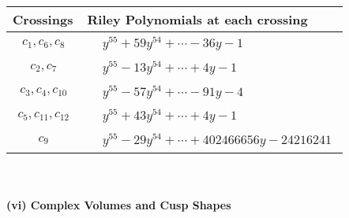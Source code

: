 \documentclass[1p]{elsarticle_modified}
\theoremstyle{definition}
\begin{document}
\begin{tabular}{m{50pt}|m{274pt}}
Crossings & \hspace{64pt}Riley Polynomials at each crossing \\
\hline $$\begin{aligned}c_{1},c_{6},c_{8}\end{aligned}$$&$\begin{aligned}
&y^{55}+59 y^{54}+\cdots-36 y-1
\end{aligned}$\\
\hline $$\begin{aligned}c_{2},c_{7}\end{aligned}$$&$\begin{aligned}
&y^{55}-13 y^{54}+\cdots+4 y-1
\end{aligned}$\\
\hline $$\begin{aligned}c_{3},c_{4},c_{10}\end{aligned}$$&$\begin{aligned}
&y^{55}-57 y^{54}+\cdots-91 y-4
\end{aligned}$\\
\hline $$\begin{aligned}c_{5},c_{11},c_{12}\end{aligned}$$&$\begin{aligned}
&y^{55}+43 y^{54}+\cdots+4 y-1
\end{aligned}$\\
\hline $$\begin{aligned}c_{9}\end{aligned}$$&$\begin{aligned}
&y^{55}-29 y^{54}+\cdots+402466656 y-24216241
\end{aligned}$\\
\hline
\end{tabular}\\~\\
\newpage\flushleft \textbf{(vi) Complex Volumes and Cusp Shapes}
\end{document}
